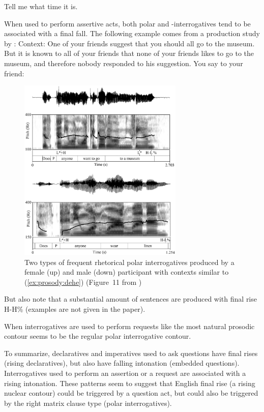 Tell me what time it is.
\eex

When used to perform assertive acts, both polar and \twh-interrogatives tend to be associated with a final fall. The following example comes from a production study by \textcite{dehe2020rhetoric}:
Context: One of your friends suggest that you should all go to the museum. But it is known to all of your friends that none of your friends likes to go to the museum, and therefore nobody responded to his suggestion. You say to your friend: 
\eex
\begin{figure}[H]
\begin{center}
\includegraphics[width = 0.7\textwidth]{figures/rhe-polar.jpg}
	\caption{Two types of frequent rhetorical polar interrogatives produced by a female (up) and male (down) participant with contexts similar to (\ref{ex:prosody:dehe}) (Figure~11 from \cite{dehe2020rhetoric}) }\label{fig:rhe-polar}
\end{center}
\end{figure}

But \textcite{dehe2020rhetoric} also note that a substantial amount of sentences are produced with final rise H-H\% (examples are not given in the paper). 

When interrogatives are used to perform requests like  the most natural prosodic contour seems to be the regular polar interrogative contour. 

To summarize, declaratives and imperatives used to ask questions have final rises (rising declaratives), but also have falling intonation (embedded questions). Interrogatives used to perform an assertion  or a request are associated with a rising intonation. These patterns seem to suggest that English final rise (a rising nuclear contour) could be triggered by a question act, but could also be triggered by the right matrix clause type (polar interrogatives).  


